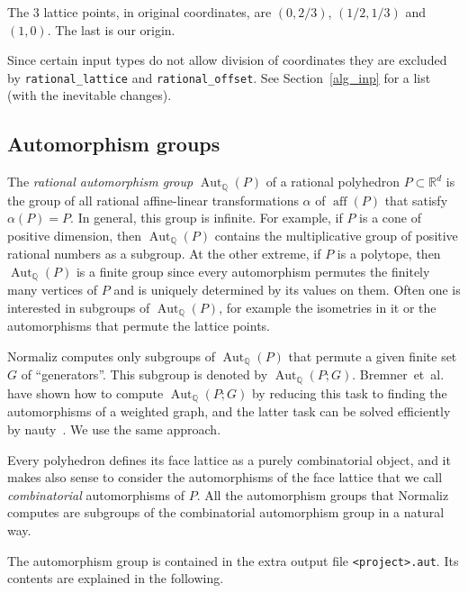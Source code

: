 \documentclass[12pt,a4paper]{scrartcl}
\theoremstyle{definition}
\def\QQ{{\mathbb Q}}
\def\RR{{\mathbb R}}
\DeclareMathOperator{\aff}{aff}
\begin{document}
The $3$ lattice points, in original coordinates, are $(0,2/3)$, $(1/2,1/3) $ and $(1,0)$. The last is our origin.

Since certain input types do not allow division of coordinates they are excluded by \verb|rational_lattice| and \verb|rational_offset|. See Section~\ref{alg_inp} for a list (with the inevitable changes).

\subsection{Automorphism groups}\label{Automorphisms}

\def\Aut{\operatorname{Aut}}

The \emph{rational automorphism group} $\Aut_\QQ(P)$ of a rational polyhedron $P\subset \RR^d$ is the group of all rational affine-linear transformations $\alpha$ of $\aff(P)$ that satisfy $\alpha(P)=P$. In general, this group is infinite. For example, if $P$ is a cone of positive dimension, then $\Aut_\QQ(P)$ contains the multiplicative group of positive rational numbers as a subgroup. At the other extreme, if $P$ is a polytope, then $\Aut_\QQ(P)$ is a finite group since every automorphism permutes the finitely many vertices of $P$ and is uniquely determined by its values on them. Often one is interested in subgroups of $\Aut_\QQ(P)$, for example the isometries in it or the automorphisms that permute the lattice points.

Normaliz computes only subgroups of $\Aut_\QQ(P)$ that permute a given finite set $G$ of ``generators''. This subgroup is denoted by $\Aut_\QQ(P;G)$. Bremner~et~al.~\cite{Bremner} have shown how to compute $\Aut_\QQ(P;G)$ by reducing this task to finding the automorphisms of a weighted graph, and the latter task can be solved efficiently by nauty~\cite{nauty}. We use the same approach.

Every polyhedron defines its face lattice as a purely combinatorial object, and it makes also sense to consider the automorphisms of the face lattice that we call \emph{combinatorial} automorphisms of $P$. All the automorphism groups that Normaliz computes are subgroups of the combinatorial automorphism group in a natural way.

The automorphism group is contained in the extra output file \verb|<project>.aut|. Its contents are explained in the following.
\end{document}
